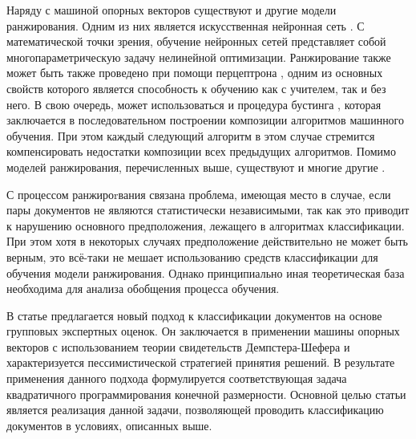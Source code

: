\documentclass[12pt,a4paper,oneside]{article}
\begin{document}
\begin{multicols}{2}
\par
Наряду с машиной опорных векторов существуют и другие модели ранжирования. 
Одним из них является искусственная нейронная сеть .  
С математической точки зрения, обучение нейронных сетей представляет собой многопараметрическую задачу нелинейной оптимизации. 
Ранжирование также может быть также проведено при помощи перцептрона  , одним из основных свойств которого является способность к обучению как с учителем, так и без него. 
В свою очередь, может использоваться и процедура бустинга , которая заключается в последовательном построении композиции алгоритмов машинного обучения. 
При этом каждый следующий алгоритм в этом случае стремится компенсировать недостатки композиции всех предыдущих алгоритмов. 
Помимо моделей ранжирования, перечисленных выше, существуют и многие другие    . 


\par
С процессом ранжироrвания связана проблема, имеющая место в случае, если пары документов не являются статистически независимыми, так как это приводит к нарушению основного предположения, лежащего в алгоритмах классификации. 
При этом хотя в некоторых случаях предположение действительно не может быть верным, это всё-таки не мешает использованию средств классификации для обучения модели ранжирования. 
Однако принципиально иная теоретическая база необходима для анализа обобщения процесса обучения. 


\par
В статье предлагается новый подход к классификации документов на основе групповых экспертных оценок.
Он заключается в применении машины опорных векторов с использованием теории свидетельств Демпстера-Шефера и характеризуется пессимистической стратегией принятия решений. 
В результате применения данного подхода формулируется соответствующая задача квадратичного программирования конечной размерности. 
Основной целью статьи является реализация данной задачи, позволяющей проводить классификацию документов в условиях, описанных выше. 




\end{multicols}
\end{document}
